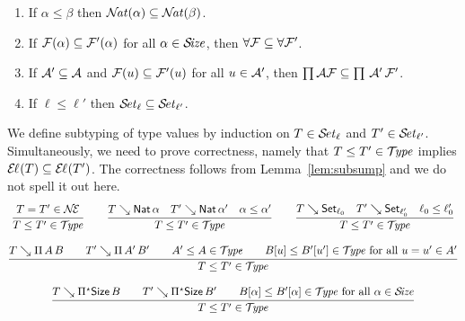 \documentclass[acmsmall,screen]{acmart}\settopmatter{}
\newcommand{\LONGVERSION}[1]{}
\begin{document}
\begin{lemma}[Subsumption]
\label{lem:subsump} \hfill
\begin{enumerate}
\item \label{it:natsub} If\/ $\alpha \leq \beta$ then $\NAT(\alpha) \subseteq \NAT(\beta)$.
\item \label{it:allsub} If\/ $\F(\alpha) \subseteq \F'(\alpha)$ for all $\alpha \in \SIZE$, then $\FORALL \F \subseteq \FORALL \F'$.
\item \label{it:pisub}  If\/ $\A' \subseteq \A$ and $\F(u) \subseteq \F'(u)$ for all $u \in \A'$, then $\PIAF \subseteq \PI\,\A'\,\F'$.
\item \label{it:usub}  If\/ $\ell \leq \ell'$ then $\SET[\ell] \subseteq \SET[\ell']$.
\end{enumerate}
\end{lemma}
\LONGVERSION{
\begin{proof}
  Propositions (\ref{it:natsub}--\ref{it:pisub}) are clear.
  For (\ref{it:usub}), prove $T = T' \in \SET[\ell']$ by induction on $T = T' \in \SET[\ell]$.
  For the base types this is direct, let us look at the function space.
\[
  \rul{T \evalsto \piT A B \qquad
      T' \evalsto \piT{A'}{B'} \qquad
      A = A' \in \SET[\ell] \qquad
      B[u] = B'[u'] \in \SET[\ell] \mforall u = u' \in \EL[\ell](A)
    }{T = T' \in \SET[\ell]}
\]
  By induction hypothesis, $A = A' \in \SET[\ell']$, and we have $\EL[\ell'](A) = \EL[\ell](A)$ by Lemma~\ref{lem:indep}.  Assuming $u = u' \in \EL(A)$, we get $B[u] = B'[u'] \in \SET[\ell']$ by induction hypothesis on $B[u] = B'[u'] \in \SET[\ell]$.
\end{proof}
}
We define subtyping of type values  by induction on $T \in \SET[\ell]$ and $T' \in \SET[\ell']$.
Simultaneously, we need to prove correctness, namely that $T \leq T' \in \TYPE$ implies $\EL(T) \subseteq \EL(T')$.  The correctness follows from Lemma~\ref{lem:subsump} and we do not spell it out here.
\begin{gather*}
  \ru{T = T' \in \NEE
    }{T \leq T' \in \TYPE}
\qquad
  \ru{T \evalsto \Nat \alpha \quad
      T' \evalsto \Nat \alpha' \quad
      \alpha \leq \alpha'
    }{T \leq T' \in \TYPE}
\qquad
  \ru{T \evalsto \Set[\ell_0] \quad
      T' \evalsto \Set[\ell_0'] \quad
      \ell_0 \leq \ell_0'
    }{T \leq T' \in \TYPE}
\\[2ex]
  \ru{T \evalsto \piT A B \qquad
      T' \evalsto \piT {A'}{B'} \qquad
      A' \leq A \in \TYPE \qquad
      B[u] \leq B'[u'] \in \TYPE \mforall u = u' \in A'
    }{T \leq T' \in \TYPE}
\\[2ex]
  \ru{T \evalsto \epiT \Size B \qquad
      T' \evalsto \epiT {\Size}{B'} \qquad
      B[\alpha] \leq B'[\alpha] \in \TYPE \mforall \alpha \in \SIZE
    }{T \leq T' \in \TYPE}
\end{gather*}
\end{document}

